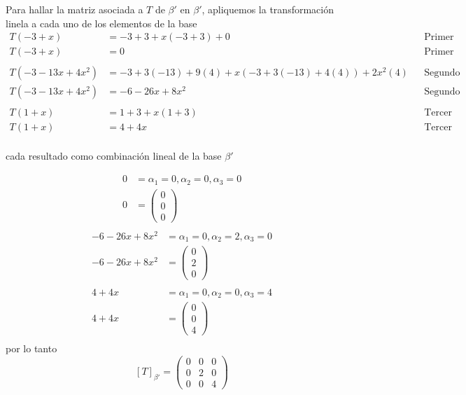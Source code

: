\documentclass[letterpaper]{article}
\renewcommand{\*}{\cdot}
\theoremstyle{definition}
\begin{document}
Para hallar la matriz asociada a $ T $ de $ \beta'  $ en $ \beta' $, apliquemos la transformación linela a cada uno de los elementos de la base
\begin{align*}
	T(-3 +x) &= -3 +3 + x(-3+3)+0 && \text{Primer elemento de la base} \\
	T(-3 +x) &= 0 && \text{Primer elemento de la base} \\
	\\
	T(-3 -13x +4x^2) &= -3 +3(-13) + 9(4) + x(-3 + 3(-13) + 4(4)) + 2x^2(4) && \text{Segundo elemento de la base}\\
	T(-3 -13x +4x^2) &= -6 -26x +8x^2 && \text{Segundo elemento de la base}\\
	\\
	T(1 +x) &= 1 + 3 +x(1 + 3) && \text{Tercer elemento de la base}\\
	T(1 +x) &= 4 + 4x&& \text{Tercer elemento de la base}\\
\end{align*}

cada resultado como combinación lineal de la base $ \beta' $

\begin{align*}
	0 &=  \alpha_1 = 0, \alpha_2= 0, \alpha_3 = 0\\
	0 &=  \begin{pmatrix}
	0\\
	0\\
	0
	\end{pmatrix}\\
\end{align*}
\begin{align*}
	-6 -26x +8x^2 &= \alpha_1 = 0, \alpha_2 = 2, \alpha_3 = 0 \\
	-6 -26x +8x^2 &= \begin{pmatrix}
	0\\
	2\\
	0
	\end{pmatrix}\\
	\\
	4 + 4x &= \alpha_1 = 0, \alpha_2 = 0, \alpha_3 = 4\\
	4 + 4x &= \begin{pmatrix}
	0\\
	0\\
	4
	\end{pmatrix}\\
\end{align*}
por lo tanto 
\[ [T]_{\beta'} = \begin{pmatrix}
0 & 0 & 0 \\
0 & 2 & 0 \\
0 & 0 & 4
\end{pmatrix} \]
\end{document}

